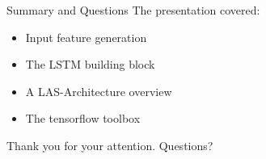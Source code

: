 \documentclass{beamer}
\begin{document}
\begin{frame}{Summary and Questions}
	The presentation covered:
	\begin{itemize}
		\item Input feature generation
		\item The LSTM building block
		\item A LAS-Architecture overview
		\item The tensorflow toolbox
	\end{itemize}
	Thank you for your attention. Questions?
\end{frame}
\end{document}
